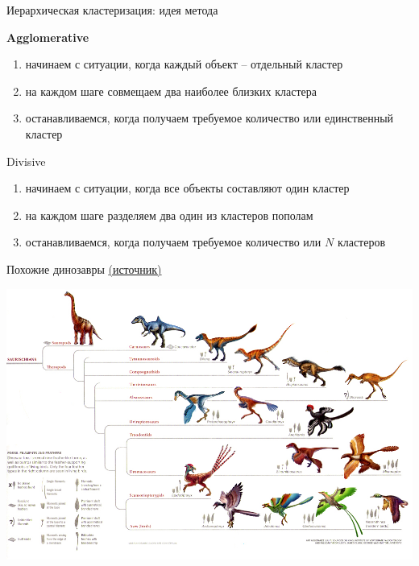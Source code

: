 \documentclass[10pt]{beamer}
\begin{document}
\begin{frame}{Иерархическая кластеризация: идея метода}

{\bf Agglomerative}
\begin{enumerate}
\item начинаем с ситуации, когда каждый объект -- отдельный кластер
\item на каждом шаге совмещаем два наиболее близких кластера
\item останавливаемся, когда получаем требуемое количество или единственный кластер
\end{enumerate}

\vspace{1em}
Divisive
\begin{enumerate}
\item начинаем с ситуации, когда все объекты составляют один кластер
\item на каждом шаге разделяем два один из кластеров пополам
\item останавливаемся, когда получаем требуемое количество или $N$ кластеров
\end{enumerate}

\end{frame}

\begin{frame}{Похожие динозавры \href{http://palaeos.com/vertebrates/coelurosauria/images/feathered_dinosaurs.jpg}{(источник)}}

\begin{center}
\includegraphics[width=\textwidth]{images/dinosaurs.jpg}
\end{center}

\end{frame}
\end{document}
